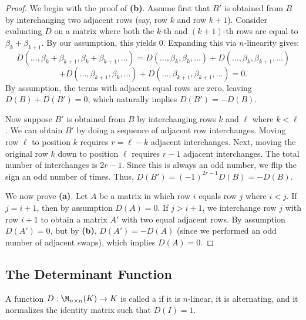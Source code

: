 \begin{proof}
  We begin with the proof of \textbf{(b)}. Assume first that $B'$ is obtained from $B$ by interchanging two adjacent rows (say, row $k$ and row $k+1$).
  Consider evaluating $D$ on a matrix where both the $k$-th and $(k+1)$-th rows are equal to $\beta_k + \beta_{k+1}$. By our assumption, this yields $0$.
  Expanding this via $n$-linearity gives:
  \[
  D(\dots, \beta_k + \beta_{k+1}, \beta_k + \beta_{k+1}, \dots) = D(\dots, \beta_k, \beta_k, \dots) + D(\dots, \beta_k, \beta_{k+1}, \dots)
  \]
  \[
  + D(\dots, \beta_{k+1}, \beta_k, \dots) + D(\dots, \beta_{k+1}, \beta_{k+1}, \dots) = 0.
  \]
  By assumption, the terms with adjacent equal rows are zero, leaving $D(B) + D(B') = 0$, which naturally implies $D(B') = -D(B)$.

  Now suppose $B'$ is obtained from $B$ by interchanging rows $k$ and $\ell$ where $k < \ell$. We can obtain $B'$ by doing a sequence of adjacent row interchanges. Moving row $\ell$ to position $k$ requires $r = \ell-k$ adjacent interchanges. Next, moving the original row $k$ down to position $\ell$ requires $r-1$ adjacent interchanges. The total number of interchanges is $2r - 1$. Since this is always an odd number, we flip the sign an odd number of times. Thus, $D(B') = (-1)^{2r-1} D(B) = -D(B)$.

  We now prove \textbf{(a)}. Let $A$ be a matrix in which row $i$ equals row $j$ where $i < j$. If $j = i+1$, then by assumption $D(A) = 0$. If $j > i+1$, we interchange row $j$ with row $i+1$ to obtain a matrix $A'$ with two equal adjacent rows.
  By assumption $D(A') = 0$, but by \textbf{(b)}, $D(A') = -D(A)$ (since we performed an odd number of adjacent swaps), which implies $D(A) = 0$.
\end{proof}

\subsection{The Determinant Function}

\begin{definition}\label{def:determinant_func}
  A function $D : \M_{n \times n}(K) \to K$ is called a  if it is $n$-linear, it is alternating, and it normalizes the identity matrix such that $D(I) = 1$.
\end{definition}

